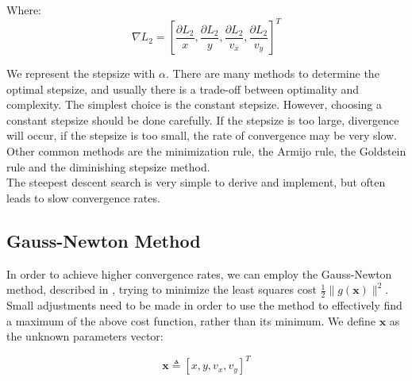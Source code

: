 \documentclass[10pt,a4paper]{report}
\begin{document}
Where:
\begin{equation}
 \nabla L_2  = [\frac{\partial L_2}{x},\frac{\partial L_2}{y},\frac{\partial L_2}{v_x},\frac{\partial L_2}{v_y}]^T 
\end{equation}

We represent the stepsize with $\alpha$. There are many methods to determine the optimal stepsize, and usually there is a trade-off between optimality and complexity. The simplest choice is the constant stepsize. However, choosing a constant stepsize should be done carefully. If the stepsize is too large, divergence will occur, if the stepsize is too small, the rate of convergence may be very slow. Other common methods are the minimization rule, the Armijo rule, the Goldstein rule and the diminishing stepsize method. \\
The steepest descent search is very simple to derive and implement, but often leads to slow convergence rates.\\

\subsection{Gauss-Newton Method}
In order to achieve higher convergence rates, we can employ the Gauss-Newton method, described in \cite{gauss_newton_method}, trying to minimize the least squares cost $\frac{1}{2}\|g(\mathbf{x})\|^2$. 
Small adjustments need to be made in order to use the method to effectively find a maximum of the above cost function, rather than its minimum.
We define $\mathbf{x}$ as the unknown parameters vector:

\begin{equation*}
\mathbf{x} \triangleq \left[ x,y,v_x,v_y \right]^T
\end{equation*}
\end{document}
